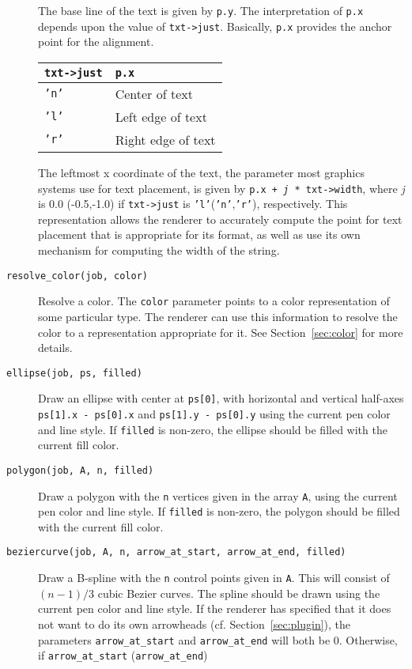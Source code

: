 \begin{description}
The base line of the text is given by {\tt p.y}. The interpretation
of {\tt p.x} depends upon the value of {\tt txt->just}. Basically,
{\tt p.x} provides the anchor point for the alignment.
\begin{center}
\begin{tabular}{ll}
{\tt txt->just} & {\tt p.x} \\ \hline
{\tt 'n'} & Center of text \\
{\tt 'l'} & Left edge of text \\
{\tt 'r'} & Right edge of text \\
\end{tabular}
\end{center}
The leftmost x coordinate of the text, the parameter most graphics
systems use for text placement, is given by 
{\tt p.x + {\em j} * txt->width}, where {\em j} is 0.0 (-0.5,-1.0)
if {\tt txt->just} is {\tt 'l'}({\tt 'n'},{\tt 'r'}), respectively.
This representation allows the renderer to accurately compute
the point for text placement that is appropriate for its format, as
well as use its own mechanism for computing the width of the string.
\item[{\tt resolve\_color(job, color)}]
Resolve a color. The {\tt color} parameter points to a color representation
of some particular type. The renderer can use this information to resolve
the color to a representation appropriate for it. See Section~\ref{sec:color}
for more details.
\item[{\tt ellipse(job, ps, filled)}]
Draw an ellipse with center at {\tt ps[0]}, with horizontal and vertical 
half-axes {\tt ps[1].x - ps[0].x} and {\tt ps[1].y - ps[0].y} 
using the current pen color and line style.
If {\tt filled} is non-zero, the ellipse should be filled with the current
fill color.
\item[{\tt polygon(job, A, n, filled)}]
Draw a polygon with the {\tt n} vertices given in the array {\tt A}, 
using the current pen color and line style.
If {\tt filled} is non-zero, the polygon should be filled with the current
fill color.
\item[{\tt beziercurve(job, A, n, arrow\_at\_start, arrow\_at\_end, filled)}]
Draw a B-spline with the {\tt n} control points given in {\tt A}. This will
consist of $(n - 1)/3$ cubic Bezier curves. The spline should be drawn
using the current pen color and line style.
If the renderer has specified that it does not want to do its own arrowheads
(cf. Section~\ref{sec:plugin}),
the parameters 
{\tt arrow\_at\_start} and {\tt arrow\_at\_end}
will both be 0. Otherwise, if {\tt arrow\_at\_start} ({\tt arrow\_at\_end}) 

\end{description}
